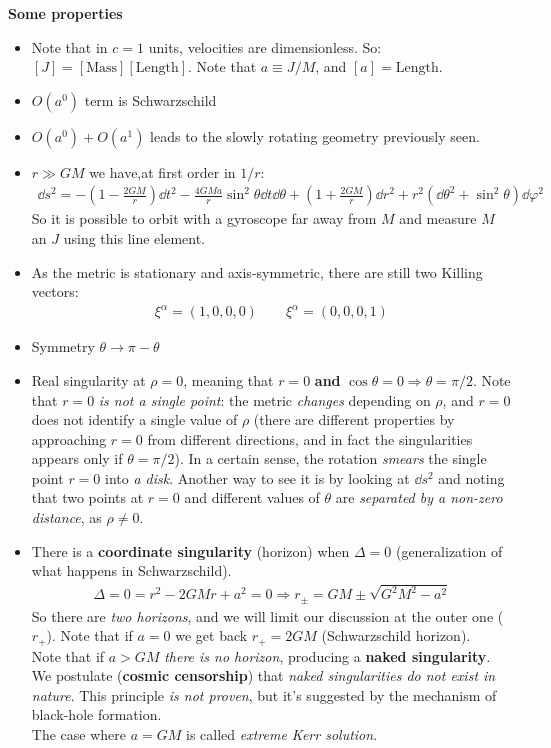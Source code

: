 \documentclass[../template.tex]{subfiles}
\begin{document}
\textbf{Some properties} 
\begin{itemize}
    \item Note that in $c=1$ units, velocities are dimensionless. So: $[J] = [\text{Mass}][\text{Length}]$. Note that $a \equiv J/M$, and $[a] = \text{Length}$.    
    \item $O(a^0)$ term is Schwarzschild
    \item $O(a^0) + O(a^1)$ leads to the slowly rotating geometry previously seen.
    \item $r \gg GM$ we have,at first order in $1/r$:
    \begin{align*}
        \dd{s^2} = -\left(1-\frac{2GM}{r} \right) \dd{t^2} -\frac{4 G M a}{r} \sin^2 \theta \dd{t} \dd{\theta}  + \left(1+\frac{2GM}{r} \right) \dd{r^2} + r^2 (\dd{\theta^2} + \sin^2 \theta) \dd{\varphi^2}
    \end{align*}  
    So it is possible to orbit with a gyroscope far away from $M$ and measure $M$ an $J$ using this line element.     
    \item As the metric is stationary and axis-symmetric, there are still two Killing vectors:
    \begin{align*}
        \xi^\alpha = (1,0,0,0) \qquad \xi^\alpha = (0,0,0,1)
    \end{align*}   
    \item Symmetry $\theta \to \pi - \theta$
    \item Real singularity at $\rho = 0$, meaning that $r= 0$ \textbf{and} $\cos \theta = 0 \Rightarrow \theta= \pi/2$. Note that $r=0$ \textit{is not a single point}: the metric \textit{changes} depending on $\rho$, and $r = 0$ does not identify a single value of $\rho$ (there are different properties by approaching $r=0$ from different directions, and in fact the singularities appears only if $\theta = \pi/2$). In a certain sense, the rotation \textit{smears} the single point $r=0$ into \textit{a disk}. Another way to see it is by looking at $\dd{s}^2$ and noting that two points at $r=0$ and different values of $\theta$ are \textit{separated by a non-zero distance}, as $\rho \neq 0$.       
    \item There is a \textbf{coordinate singularity} (horizon) when $\Delta = 0$ (generalization of what happens in Schwarzschild).
    \begin{align*}
        \Delta = 0 = r^2 -2 GM r + a^2 = 0 \Rightarrow r_{\pm} = GM \pm \sqrt{G^2 M^2 - a^2}
    \end{align*} 
    So there are \textit{two horizons}, and we will limit our discussion at the outer one ($r_+$). Note that if $a=0$ we get back $r_+ = 2GM$ (Schwarzschild horizon). \\
    Note that if $a > GM$ \textit{there is no horizon}, producing a \textbf{naked singularity}. We postulate (\textbf{cosmic censorship}) that \textit{naked singularities do not exist in nature}. This principle \textit{is not proven}, but it's suggested by the mechanism of black-hole formation.\\
    The case where $a = GM$ is called \textit{extreme Kerr solution}.        
\end{itemize}
\end{document}
